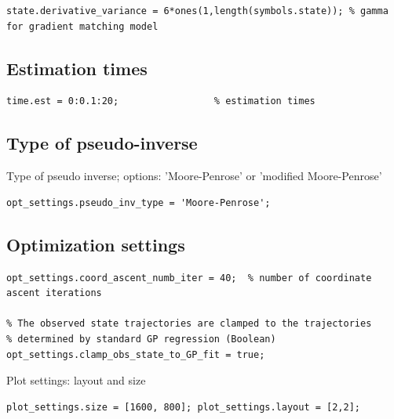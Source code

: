 \color{RoyalPurple}\begin{verbatim}
state.derivative_variance = 6*ones(1,length(symbols.state)); % gamma for gradient matching model
\end{verbatim}
\color{black}
\begin{par}
\subsection{ Estimation times }
\end{par} \vspace{1em}
\color{RoyalPurple}\begin{verbatim}
time.est = 0:0.1:20;                 % estimation times
\end{verbatim}
\color{black}
\begin{par}
\subsection{ Type of pseudo-inverse } Type of pseudo inverse; options: 'Moore-Penrose' or 'modified Moore-Penrose'
\end{par} \vspace{1em}
\color{RoyalPurple}\begin{verbatim}
opt_settings.pseudo_inv_type = 'Moore-Penrose';
\end{verbatim}
\color{black}
\begin{par}
\subsection{ Optimization settings }
\end{par} \vspace{1em}
\color{RoyalPurple}\begin{verbatim}
opt_settings.coord_ascent_numb_iter = 40;  % number of coordinate ascent iterations

% The observed state trajectories are clamped to the trajectories
% determined by standard GP regression (Boolean)
opt_settings.clamp_obs_state_to_GP_fit = true;
\end{verbatim}
\color{black}
\begin{par}
Plot settings: layout and size
\end{par} \vspace{1em}
\color{RoyalPurple}\begin{verbatim}
plot_settings.size = [1600, 800]; plot_settings.layout = [2,2];
\end{verbatim}
\color{black}


